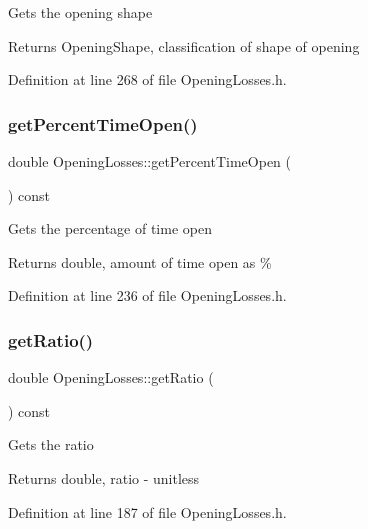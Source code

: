 Gets the opening shape \begin{DoxyReturn}{Returns}
Opening\+Shape, classification of shape of opening 
\end{DoxyReturn}


Definition at line 268 of file Opening\+Losses.\+h.

\mbox{\label{class_opening_losses_aeefc3790a569008ff2e804033a9efea3}} 
\subsubsection{\texorpdfstring{get\+Percent\+Time\+Open()}{getPercentTimeOpen()}}
{\footnotesize\ttfamily double Opening\+Losses\+::get\+Percent\+Time\+Open (\begin{DoxyParamCaption}{ }\end{DoxyParamCaption}) const\hspace{0.3cm}{\ttfamily [inline]}}

Gets the percentage of time open \begin{DoxyReturn}{Returns}
double, amount of time open as \% 
\end{DoxyReturn}


Definition at line 236 of file Opening\+Losses.\+h.

\mbox{\label{class_opening_losses_ac9f7dbd2cc023932b5d8076a21a3f690}} 
\subsubsection{\texorpdfstring{get\+Ratio()}{getRatio()}}
{\footnotesize\ttfamily double Opening\+Losses\+::get\+Ratio (\begin{DoxyParamCaption}{ }\end{DoxyParamCaption}) const\hspace{0.3cm}{\ttfamily [inline]}}

Gets the ratio \begin{DoxyReturn}{Returns}
double, ratio -\/ unitless 
\end{DoxyReturn}


Definition at line 187 of file Opening\+Losses.\+h.

